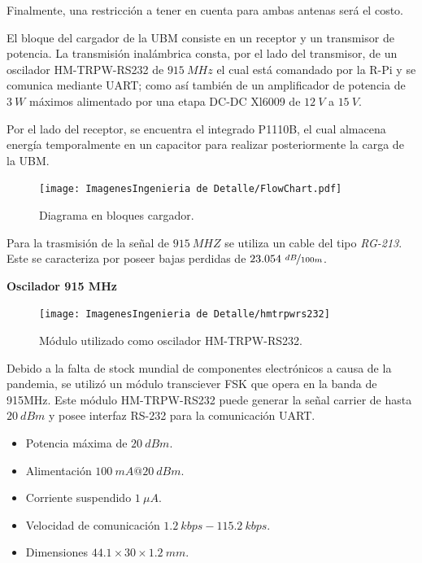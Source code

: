 Finalmente, una restricción a tener en cuenta para ambas antenas será el costo.


El bloque del cargador de la UBM consiste en un receptor y un transmisor de potencia. La transmisión inalámbrica consta, por el lado del transmisor, de un oscilador HM-TRPW-RS232 de $915 \ MHz$ el cual está comandado por la R-Pi y se comunica mediante UART; como así también de un amplificador de potencia de $3 \ W$ máximos alimentado por una etapa DC-DC Xl6009 de $12 \ V$ a $15 \ V$.

Por el lado del receptor, se encuentra el integrado P1110B, el cual almacena energía temporalmente en un capacitor para realizar posteriormente la carga de la UBM.

\begin{figure}[H]
	\centering	
	\texttt{[image: ImagenesIngenieria de Detalle/FlowChart.pdf]}
	\caption{Diagrama en bloques cargador.}
	\label{fig:diagrama_hardware_antenas}
\end{figure}

Para la trasmisión de la señal de $915 \ MHZ$ se utiliza un cable del tipo \textit{RG-213}. Este se caracteriza por poseer bajas perdidas de $23.054 \ \nicefrac{dB}{100m}$.

\bigskip

\textbf{Oscilador 915 MHz}

\begin{figure}[H]
	\centering	
	\texttt{[image: ImagenesIngenieria de Detalle/hmtrpwrs232]}
	\caption{Módulo utilizado como oscilador HM-TRPW-RS232.}
	\label{fig:oscilador}
\end{figure}

Debido a la falta de stock mundial de componentes electrónicos a causa de la pandemia, se utilizó un módulo transciever FSK que opera en la banda de 915MHz. Este módulo HM-TRPW-RS232 puede generar la señal carrier de hasta $20 \ dBm$ y posee interfaz RS-232 para la comunicación UART.

\begin{itemize}
	\item Potencia máxima de $20 \ dBm$.
	\item Alimentación $100 \ mA@20 \ dBm$.
	\item Corriente suspendido $1 \ \mu A$.
	\item Velocidad de comunicación $1.2 \ kbps - 115.2 \ kbps$.
	\item Dimensiones $44.1 \times 30  \times 1.2 \ mm$.
\end{itemize}

